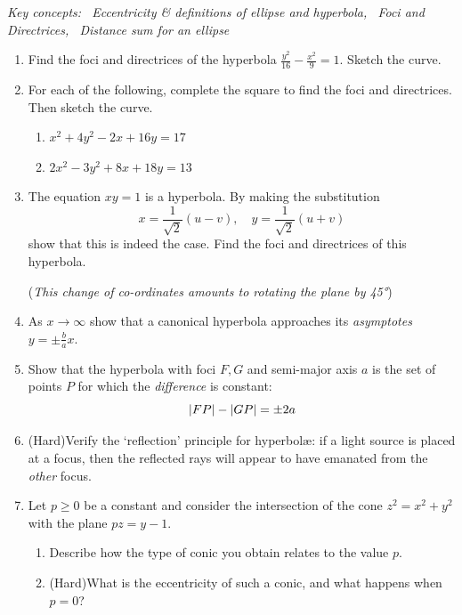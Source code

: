 \begin{exercises}{}{}
	\hangindent\leftmargini\emph{Key concepts: \ Eccentricity \& definitions of ellipse and hyperbola, \ Foci and Directrices, \ Distance sum for an ellipse}

	\begin{enumerate}
	  \item Find the foci and directrices of the hyperbola $\frac{y^2}{16}-\frac{x^2}{9}=1$. Sketch the curve.
	  
	  \item For each of the following, complete the square to find the foci and directrices. Then sketch the curve.
	  \begin{enumerate}
	    \item $x^2+4y^2-2x+16y=17$ %
	    \item $2x^2-3y^2+8x+18y=13$%
	  \end{enumerate}
	  
	  
	 	\item The equation $xy=1$ is a hyperbola. By making the substitution
	 	\[
	 		x=\frac 1{\sqrt 2}(u-v),\quad y=\frac 1{\sqrt 2}(u+v)
	 	\]
	 	show that this is indeed the case. Find the foci and directrices of this hyperbola.\par
	 	(\emph{This change of co-ordinates amounts to rotating the plane by \ang{45}})
	 	
	  
	  \item As $x\to\infty$ show that a canonical hyperbola approaches its \emph{asymptotes} $y=\pm \frac bax$.
	  
	  
		\item Show that the hyperbola with foci $F,G$ and semi-major axis $a$ is the set of points $P$ for which the \emph{difference} is constant:
		\[
			\left| FP\right|-\left| GP\right|=\pm 2a
		\]
	  
	  \item\label{exs:hyperrefl} (Hard)\lstsp Verify the `reflection' principle for hyperbolæ: if a light source is placed at a focus, then the reflected rays will appear to have emanated from the \emph{other} focus.
	 
			
	 	\item Let $p\ge 0$ be a constant and consider the intersection of the cone $z^2=x^2+y^2$ with the plane $pz=y-1$.
	 	\begin{enumerate}
	 	  \item Describe how the type of conic you obtain relates to the value $p$.
	 	  \item (Hard)\lstsp What is the eccentricity of such a conic, and what happens when $p=0$?
	 	\end{enumerate}
	\end{enumerate}



\end{exercises}
